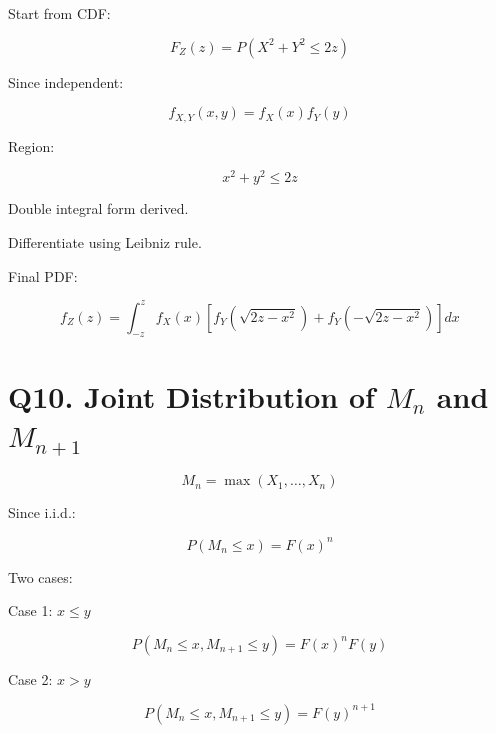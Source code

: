 \documentclass[11pt]{article}
\begin{document}
Start from CDF:

\[
F_Z(z)=P(X^2+Y^2\le2z)
\]

Since independent:

\[
f_{X,Y}(x,y)=f_X(x)f_Y(y)
\]

Region:

\[
x^2+y^2\le2z
\]

Double integral form derived.

Differentiate using Leibniz rule.

Final PDF:

\[
f_Z(z)=\int_{-z}^{z}f_X(x)\left[f_Y(\sqrt{2z-x^2})+f_Y(-\sqrt{2z-x^2})\right]dx
\]

\section*{Q10. Joint Distribution of $M_n$ and $M_{n+1}$}

\[
M_n=\max(X_1,\dots,X_n)
\]

Since i.i.d.:

\[
P(M_n\le x)=F(x)^n
\]

Two cases:

Case 1: $x\le y$

\[
P(M_n\le x,M_{n+1}\le y)=F(x)^nF(y)
\]

Case 2: $x>y$

\[
P(M_n\le x,M_{n+1}\le y)=F(y)^{n+1}
\]
\end{document}
